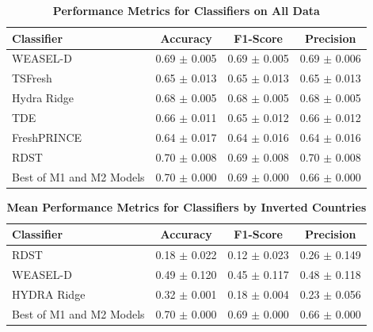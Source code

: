 \documentclass{ieeeaccess}
\begin{document}
    \begin{table}[!h]
        \caption{\textbf{Performance Metrics for Classifiers on All Data}}
        \label{tab:results_all}
        \centering
        \setlength{\tabcolsep}{3pt}
        \begin{tabular}{|l|c|c|c|}
        \hline
        \textbf{Classifier} & \textbf{Accuracy} & \textbf{F1-Score} & \textbf{Precision} \\ 
        \hline
        WEASEL-D            & 0.69 $\pm$ 0.005 & 0.69 $\pm$ 0.005 & 0.69 $\pm$ 0.006 \\ 
        TSFresh             & 0.65 $\pm$ 0.013 & 0.65 $\pm$ 0.013 & 0.65 $\pm$ 0.013 \\ 
        Hydra Ridge         & 0.68 $\pm$ 0.005 & 0.68 $\pm$ 0.005 & 0.68 $\pm$ 0.005 \\ 
        TDE                 & 0.66 $\pm$ 0.011 & 0.65 $\pm$ 0.012 & 0.66 $\pm$ 0.012 \\ 
        FreshPRINCE         & 0.64 $\pm$ 0.017 & 0.64 $\pm$ 0.016 & 0.64 $\pm$ 0.016 \\ 
        RDST                & 0.70 $\pm$ 0.008 & 0.69 $\pm$ 0.008 & 0.70 $\pm$ 0.008 \\ 
        Best of M1 and M2 Models & 0.70 $\pm$ 0.000 & 0.69 $\pm$ 0.000 & 0.66 $\pm$ 0.000 \\ 
        \hline
        \end{tabular}
        \end{table}

\begin{table}[!h]
    \caption{\textbf{Mean Performance Metrics for Classifiers by Inverted Countries}}
    \label{tab:results_inverted}
    \centering
    \setlength{\tabcolsep}{3pt}
    \begin{tabular}{|l|c|c|c|}
    \hline
    \textbf{Classifier} & \textbf{Accuracy} & \textbf{F1-Score} & \textbf{Precision} \\ 
    \hline
    RDST & 0.18 $\pm$ 0.022 & 0.12 $\pm$ 0.023 & 0.26 $\pm$ 0.149 \\ 
    WEASEL-D & 0.49 $\pm$ 0.120 & 0.45 $\pm$ 0.117 & 0.48 $\pm$ 0.118 \\ 
    HYDRA Ridge & 0.32 $\pm$ 0.001 & 0.18 $\pm$ 0.004 & 0.23 $\pm$ 0.056 \\ 
    Best of M1 and M2 Models & 0.70 $\pm$ 0.000 & 0.69 $\pm$ 0.000 & 0.66 $\pm$ 0.000 \\ 
    \hline
    \end{tabular}
\end{table}
\end{document}
